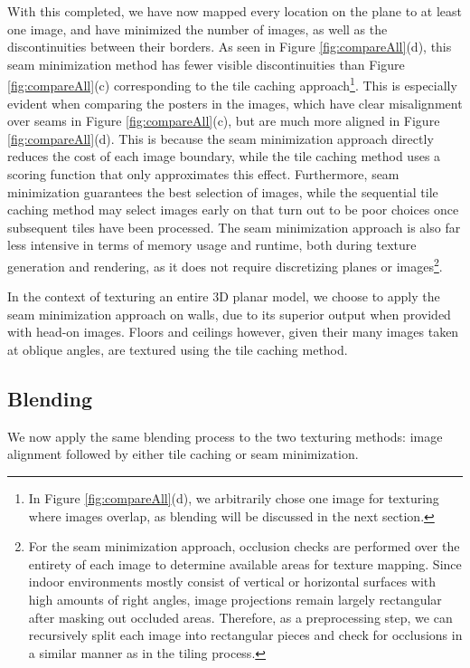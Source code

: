 \message{ !name(oldpaper.tex)}\documentclass[10pt,twocolumn,letterpaper]{article}
\begin{document}
With this completed, we have now mapped every location on the plane to
at least one image, and have minimized the number of images, as well
as the discontinuities between their borders. As seen in Figure
\ref{fig:compareAll}(d), this seam minimization method has fewer
visible discontinuities than Figure \ref{fig:compareAll}(c)
corresponding to the tile caching approach\footnote{In Figure
  \ref{fig:compareAll}(d), we arbitrarily chose one image for
  texturing where images overlap, as blending will be discussed in the
  next section.}. This is especially evident when comparing the
posters in the images, which have clear misalignment over seams in
Figure \ref{fig:compareAll}(c), but are much more aligned in Figure
\ref{fig:compareAll}(d). This is because the seam minimization
approach directly reduces the cost of each image boundary, while the
tile caching method uses a scoring function that only approximates
this effect. Furthermore, seam minimization guarantees the best
selection of images, while the sequential tile caching method may
select images early on that turn out to be poor choices once
subsequent tiles have been processed. The seam minimization approach
is also far less intensive in terms of memory usage and runtime, both
during texture generation and rendering, as it does not require
discretizing planes or images\footnote {For the seam minimization
  approach, occlusion checks are performed over the entirety of each
  image to determine available areas for texture mapping. Since indoor
  environments mostly consist of vertical or horizontal surfaces with
  high amounts of right angles, image projections remain largely
  rectangular after masking out occluded areas. Therefore, as a
  preprocessing step, we can recursively split each image into
  rectangular pieces and check for occlusions in a similar manner as
  in the tiling process.  }.

In the context of texturing an entire 3D planar model, we choose to
apply the seam minimization approach on walls, due to its superior
output when provided with head-on images. Floors and ceilings however,
given their many images taken at oblique angles, are textured using
the tile caching method.



\subsection{Blending}
\label{sec:blending}
We now apply the same blending process to the two texturing methods:
image alignment followed by either tile caching or seam minimization.
\end{document}
